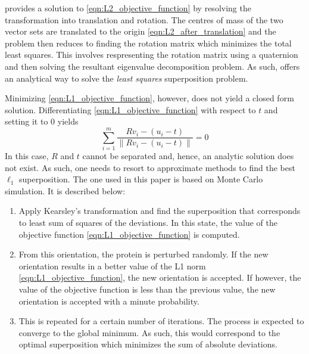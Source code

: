 \documentclass[wcp]{jmlr}
\begin{document}
\citet{kearsley89} provides a solution to \eqref{eqn:L2_objective_function} by 
resolving the transformation into translation and rotation. The centres of mass of the
two vector sets are translated to the origin \eqref{eqn:L2_after_translation} and the problem then reduces to finding the
rotation matrix which minimizes the total least squares. This involves respresenting
the rotation matrix using a quaternion and then solving the resultant eigenvalue 
decomposition problem. As such, \citet{kearsley89} offers an analytical way to solve
the \emph{least squares} superposition problem. 
 
Minimizing \eqref{eqn:L1_objective_function}, however, does not yield a closed form solution. 
Differentiating \eqref{eqn:L1_objective_function} with respect to $t$ and setting it to $0$ yields
\begin{equation}
\sum_{i=1}^m \frac{Rv_i-(u_i-t)}{\|Rv_i-(u_i-t)\|} = 0 \label{eqn:L1_after_translation}
\end{equation} 
In this case, $R$ and $t$ cannot be separated and, hence, an analytic solution does not exist. 
As such, one needs to resort to approximate methods to find the best $\ell_1$ superposition.
The one used in this paper is based on Monte Carlo simulation. 
It is described below:
\begin{enumerate}
\item Apply Kearsley's transformation and find the superposition that corresponds
to least sum of squares of the deviations. In this state, the value of the 
objective function \eqref{eqn:L1_objective_function} is computed. 
\item From this orientation, the protein is perturbed randomly. If the new orientation
results in a better value of the L1 norm \eqref{eqn:L1_objective_function}, the new orientation is
accepted. If however, the value of the objective function is less than the previous
value, the new orientation is accepted with a minute probability.
\item This is repeated for a certain number of iterations. The process is expected to converge to
the global minimum. As such, this would correspond to the optimal
superposition which minimizes the sum of absolute deviations.
\end{enumerate}
\end{document}
